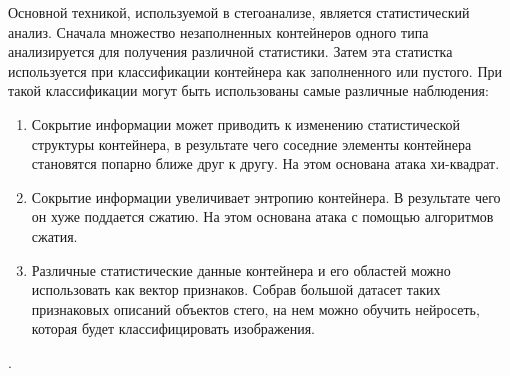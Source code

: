 Основной техникой, используемой в стегоанализе, является статистический анализ.
Сначала множество незаполненных контейнеров одного типа анализируется для получения
различной статистики. Затем эта статистка используется при классификации контейнера
как заполненного или пустого. При такой классификации могут быть использованы
самые различные наблюдения:
\begin{enumerate}
    \item Сокрытие информации может приводить к изменению статистической структуры
    контейнера, в результате чего соседние элементы контейнера становятся попарно ближе
    друг к другу. На этом основана атака хи-квадрат.
    \item Сокрытие информации увеличивает энтропию контейнера. В результате чего он
    хуже поддается сжатию. На этом основана атака с помощью алгоритмов сжатия.
    \item Различные статистические данные контейнера и его областей можно использовать
    как вектор признаков. Собрав большой датасет таких признаковых описаний объектов стего,
    на нем можно обучить нейросеть, которая будет классифицировать изображения.
\end{enumerate}.